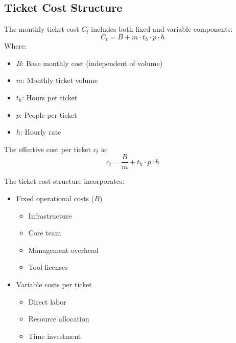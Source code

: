 \documentclass[12pt,a4paper]{article}
\newenvironment{definition}[1]
{\begin{mdframed}[style=definitionstyle,frametitle={Definition: #1}]}
{\end{mdframed}}
\newenvironment{explanation}
{\begin{mdframed}[style=explanationstyle,frametitle={Explanation}]}
{\end{mdframed}}
\begin{document}
\subsection{Ticket Cost Structure}

\begin{definition}{Base Ticket Cost}
The monthly ticket cost $C_t$ includes both fixed and variable components:
\begin{equation}
    C_t = B + m \cdot t_h \cdot p \cdot h
\end{equation}
Where:
\begin{itemize}
    \item $B$: Base monthly cost (independent of volume)
    \item $m$: Monthly ticket volume
    \item $t_h$: Hours per ticket
    \item $p$: People per ticket
    \item $h$: Hourly rate
\end{itemize}

The effective cost per ticket $c_t$ is:
\begin{equation}
    c_t = \frac{B}{m} + t_h \cdot p \cdot h
\end{equation}
\end{definition}

\begin{explanation}
The ticket cost structure incorporates:
\begin{itemize}
    \item Fixed operational costs ($B$)
        \begin{itemize}
            \item Infrastructure
            \item Core team
            \item Management overhead
            \item Tool licenses
        \end{itemize}
    \item Variable costs per ticket
        \begin{itemize}
            \item Direct labor
            \item Resource allocation
            \item Time investment
        \end{itemize}
\end{itemize}
\end{explanation}
\end{document}
